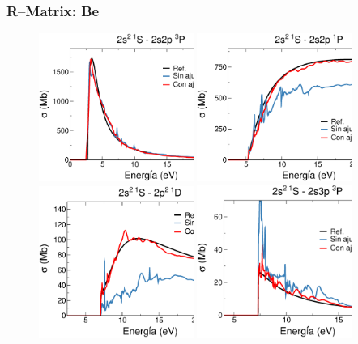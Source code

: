 \documentclass[14pt,compress]{beamer}
\begin{document}
\begin{frame}
\frametitle{R--Matrix: Be}

\vspace{-0.2cm}
\begin{figure}
\includegraphics[width=0.45\textwidth]{figures/rmatrix/sig001-002.eps} 
\hspace{0.3cm}
\includegraphics[width=0.45\textwidth]{figures/rmatrix/sig001-003.eps} \\
\vspace{0.1cm}
\includegraphics[width=0.45\textwidth]{figures/rmatrix/sig001-006.eps} 
\hspace{0.3cm}
\includegraphics[width=0.45\textwidth]{figures/rmatrix/sig001-007.eps}
\end{figure}

\end{frame}
\end{document}
